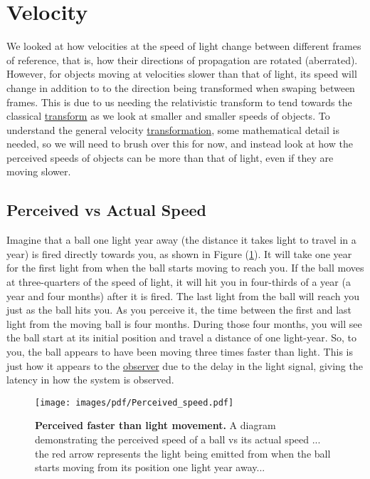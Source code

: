 \section{Velocity} \label{sect: (intro) Velocity}

We looked at how velocities at the speed of light change between different frames of reference, that is, how their directions of propagation are rotated (aberrated).
However, for objects moving at velocities slower than that of light, its speed will change in addition to to the direction being transformed when swaping between frames.
This is due to us needing the relativistic transform to tend towards the classical \hyperlink{def-transform}{transform} as we look at smaller and smaller speeds of objects.
To understand the general velocity \hyperlink{def-transform}{transformation}, some mathematical detail is needed, so we will need to brush over this for now, and instead look at how the perceived speeds of objects can be more than that of light, even if they are moving slower.

\subsection{Perceived vs Actual Speed} \label{subsect: Perceived vs Actual Speed}

Imagine that a ball one light year away (the distance it takes light to travel in a year) is fired directly towards you, as shown in Figure (\ref{fig: perceived vs actual speed}).
It will take one year for the first light from when the ball starts moving to reach you.
If the ball moves at three-quarters of the speed of light, it will hit you in four-thirds of a year (a year and four months) after it is fired.
The last light from the ball will reach you just as the ball hits you.
As you perceive it, the time between the first and last light from the moving ball is four months.
During those four months, you will see the ball start at its initial position and travel a distance of one light-year.
So, to you, the ball appears to have been moving three times faster than light.
This is just how it appears to the \hyperlink{def-observer}{observer} due to the delay in the light signal, giving the latency in how the system is observed.

\begin{figure}[H]
	\centering
	\texttt{[image: images/pdf/Perceived\_speed.pdf]}
	\caption{\textbf{Perceived faster than light movement.} A diagram demonstrating the perceived speed of a ball vs its actual speed ... the red arrow represents the light being emitted from when the ball starts moving from its position one light year away...}
	\label{fig: perceived vs actual speed}
\end{figure}

